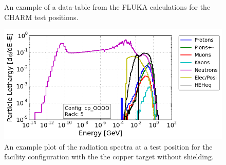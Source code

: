 \documentclass[main.tex]{subfiles}
\begin{document}
\begin{figure}[!ht]
	\centering
	\caption{An example of a data-table from the FLUKA calculations for the CHARM test positions.}
	\label{fig:fluka_dataset}
\end{figure}

\begin{figure}[!ht]
	\centering
	\includegraphics[scale=0.6]{./images/spectra_cp_OOOO_r5}
	\caption{An example plot of the radiation spectra at a test position for the facility configuration with the the copper target without shielding.}
	\label{fig:cpOOOO_spectra}
\end{figure}
\end{document}
